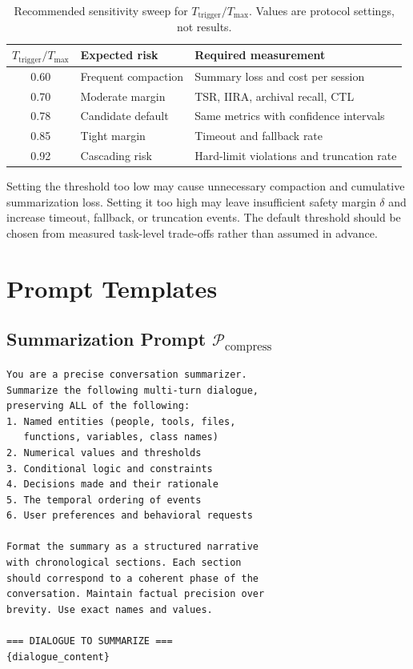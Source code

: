 \documentclass[10pt,twocolumn]{article}
\newcommand{\Tmax}{T_{\max}}
\newcommand{\Ttrig}{T_{\mathrm{trigger}}}
\begin{document}
\begin{table}[h]
\centering
\caption{Recommended sensitivity sweep for $\Ttrig / \Tmax$. Values are protocol settings, not results.}
\label{tab:sensitivity}
\small
\begin{tabular}{@{}cll@{}}
\toprule
$\Ttrig / \Tmax$ & \textbf{Expected risk} & \textbf{Required measurement} \\
\midrule
0.60 & Frequent compaction & Summary loss and cost per session \\
0.70 & Moderate margin & TSR, IIRA, archival recall, CTL \\
0.78 & Candidate default & Same metrics with confidence intervals \\
0.85 & Tight margin & Timeout and fallback rate \\
0.92 & Cascading risk & Hard-limit violations and truncation rate \\
\bottomrule
\end{tabular}
\end{table}

Setting the threshold too low may cause unnecessary compaction and cumulative summarization loss. Setting it too high may leave insufficient safety margin $\delta$ and increase timeout, fallback, or truncation events. The default threshold should be chosen from measured task-level trade-offs rather than assumed in advance.


\section{Prompt Templates}\label{app:prompts}

\subsection{Summarization Prompt $\mathcal{P}_{\mathrm{compress}}$}

\begin{lstlisting}[language={},basicstyle=\ttfamily\scriptsize]
You are a precise conversation summarizer.
Summarize the following multi-turn dialogue,
preserving ALL of the following:
1. Named entities (people, tools, files,
   functions, variables, class names)
2. Numerical values and thresholds
3. Conditional logic and constraints
4. Decisions made and their rationale
5. The temporal ordering of events
6. User preferences and behavioral requests

Format the summary as a structured narrative
with chronological sections. Each section
should correspond to a coherent phase of the
conversation. Maintain factual precision over
brevity. Use exact names and values.

=== DIALOGUE TO SUMMARIZE ===
{dialogue_content}
\end{lstlisting}
\end{document}
